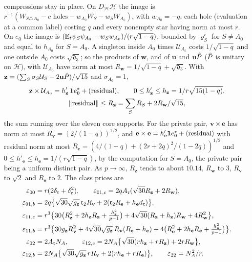 compressions stay in place. On $D_{\mathcal H}\mathcal H$ the image is
$r^{-1}(W_{S\triangle A_0}-\text{$c$ holes}-w_{A_0}W_S-w_SW_{A_0})$, with $w_{A_0}=-q$, each
hole (evaluation at a common label) costing $q$ and every nonempty star having norm at
most $r$. On $e_0$ the image is $(\mathbb E_t\psi_S\psi_{A_0}-w_Sw_{A_0})/(r\sqrt{1-q})$, bounded
by $\varrho^c_S$ for $S\ne A_0$ and equal to $h_{A_0}$ for $S=A_0$. A singleton inside
$A_0$ times $\mathcal U_{A_0}$ costs $1/\sqrt{1-q}$ and one outside $A_0$ costs
$\sqrt{\mathfrak d_3}$; so the products of $\mathbf w$, and of $\mathbf u$ and
$\mathbf u\hat P$ ($\hat P$ is unitary on $\mathcal H$), with $\mathcal U_{A_0}$ have norm at most
$R_{\mathbf w}=1/\sqrt{1-q}+\sqrt{\mathfrak d_3}$. With
$\mathbf z=(\sum_S\sigma_S\mathcal U_S-2\mathbf u\hat P)/\sqrt{15}$ and $\sigma_{A_0}=1$,
\begin{gather*}
 \mathbf z\times\mathcal U_{A_0}=h'_{\mathbf z}\,\mathbf 1 e_0^*+(\text{residual}),\qquad
 0\le h'_{\mathbf z}\le h_{\mathbf z}=1/r\sqrt{15(1-q)},\\
 \|\text{residual}\|\le R_{\mathbf z}=\sum_SR_S+2R_{\mathbf w}/\sqrt{15},
\end{gather*}
the sum running over the eleven core supports. For the private pair, $\mathbf v\times\mathbf e$
has norm at most $R_{\mathbf v}=(2/(1-q))^{1/2}$, and
$\mathbf e\times\mathbf e=h'_{\mathbf e}\mathbf 1 e_0^*+(\text{residual})$ with residual norm at most
$R_{\mathbf e}=(4/(1-q)+(2r+2q)^2/(1-2q))^{1/2}$ and
$0\le h'_{\mathbf e}\le h_{\mathbf e}=1/(r\sqrt{1-q})$, by the computation for $S=A_0$, the
private pair being a uniform distinct pair. As $p\to\infty$, $R_{\mathbf z}$ tends to about
$10.14$, $R_{\mathbf w}$ to $3$, $R_{\mathbf v}$ to $\sqrt2$ and $R_{\mathbf e}$ to $2$. The class
prices are
\begin{align*}
 \varepsilon_{00}&=r(2\delta_{\mathfrak r}+\delta_{\mathfrak r}^2),\qquad
 \varepsilon_{01,c}=2qA_{\mathfrak r}(\sqrt{30}R_{\mathbf z}+2R_{\mathbf w}),\\
 \varepsilon_{01,b}&=2q\bigl\{\sqrt{30}\sqrt{g_{\mathbf z}}\,\mathfrak r_2R_{\mathbf v}
   +2(\mathfrak r_2R_{\mathbf e}+h_{\mathbf e}d_{\mathfrak r})\bigr\},\\
 \varepsilon_{11,c}&=r^3\bigl\{30\bigl(R_{\mathbf z}^2+2h_{\mathbf z}R_{\mathbf z}
   +\tfrac{h_{\mathbf z}^2}{p-1}\bigr)+4\sqrt{30}(R_{\mathbf z}+h_{\mathbf z})R_{\mathbf w}
   +4R_{\mathbf w}^2\bigr\},\\
 \varepsilon_{11,b}&=r^3\bigl\{30g_{\mathbf z}R_{\mathbf v}^2
   +4\sqrt{30}\sqrt{g_{\mathbf z}}\,R_{\mathbf v}(R_{\mathbf e}+h_{\mathbf e})
   +4\bigl(R_{\mathbf e}^2+2h_{\mathbf e}R_{\mathbf e}+\tfrac{h_{\mathbf e}^2}{p-1}\bigr)\bigr\},\\
 \varepsilon_{02}&=2A_{\mathfrak r}N_A,\qquad
 \varepsilon_{12,c}=2N_A\bigl\{\sqrt{30}(rh_{\mathbf z}+rR_{\mathbf z})+2rR_{\mathbf w}\bigr\},\\
 \varepsilon_{12,b}&=2N_A\bigl\{\sqrt{30}\sqrt{g_{\mathbf z}}\,rR_{\mathbf v}
   +2(rh_{\mathbf e}+rR_{\mathbf e})\bigr\},\qquad
 \varepsilon_{22}=N_A^2/r,
\end{align*}
